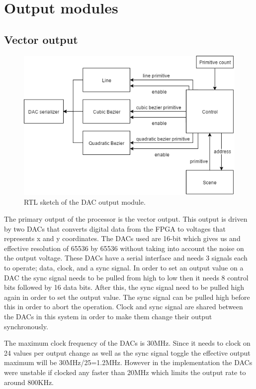 \chapter{Output modules}
\label{chap:Output}

\section{Vector output}

\begin{figure}[h!]
    \includegraphics[width=\linewidth]{images/dac-output.png}
    \caption{RTL sketch of the \vthreek DAC output module.}
    \label{fig:dac-output}
\end{figure}

The primary output of the processor is the vector output.
This output is driven by two DACs that converts digital data from the FPGA to voltages that represents x and y coordinates.
The DACs used are 16-bit which gives us and effective resolution of 65536 by 65536 without taking into account the noise on the output voltage.
These DACs have a serial interface and needs 3 signals each to operate; data, clock, and a sync signal. 
In order to set an output value on a DAC the sync signal needs to be pulled from high to low then it needs 8 control bits followed by 16 data bits. 
After this, the sync signal need to be pulled high again in order to set the output value. 
The sync signal can be pulled high before this in order to abort the operation.
Clock and sync signal are shared between the DACs in this system in order to make them change their output synchronously.

The maximum clock frequency of the DACs is 30MHz. 
Since it needs to clock on 24 values per output change as well as the sync signal toggle the effective output maximum will be 30MHz/25=1.2MHz.
However in the implementation the DACs were unstable if clocked any faster than 20MHz which limits the output rate to around 800KHz.

